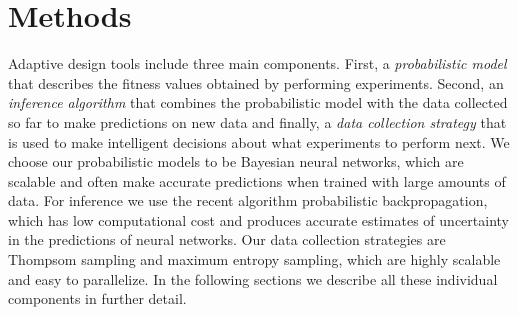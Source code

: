 \section{Methods}

Adaptive design tools include three main components. First, a
\emph{probabilistic model} that describes the fitness values obtained by
performing experiments. Second, an \emph{inference algorithm} that combines the
probabilistic model with the data collected so far to make predictions on new
data and finally, a \emph{data collection strategy} that is used to make
intelligent decisions about what experiments to perform next. We choose our
probabilistic models to be Bayesian neural networks, which are scalable
and often make accurate predictions when trained with large amounts of data. For
inference we use the recent algorithm probabilistic backpropagation, which has low computational cost and produces accurate
estimates of uncertainty in the predictions of neural networks. Our data collection strategies are Thompsom sampling and maximum entropy sampling, which are highly scalable and easy to parallelize.
In the following sections we describe all these individual components in further detail.




